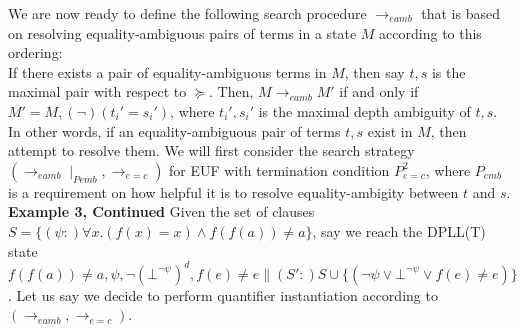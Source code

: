 \documentclass{llncs}
\begin{document}
We are now ready to define the following search procedure $\rightarrow_{eamb}$ that is based on resolving equality-ambiguous pairs of terms in a state $M$ according to this ordering: \\

If there exists a pair of equality-ambiguous terms in $M$, then say $t, s$ is the maximal pair with respect to $\succeq$.
Then, $M \rightarrow_{eamb} M'$ if and only if $M' = M, (\neg)(t_i' = s_i')$, where $t_i', s_i'$ is the maximal depth ambiguity of $t, s$. \\

In other words, if an equality-ambiguous pair of terms $t,s$ exist in $M$, then attempt to resolve them. 
We will first consider the search strategy $( \rightarrow_{eamb} \mid_{Pemb}, \rightarrow_{e=c} )$ for EUF with termination condition $P^2_{e=c}$, where $P_{emb}$ is a requirement on how helpful it is to resolve equality-ambigity between $t$ and $s$. \\

{\bf Example 3, Continued}
Given the set of clauses $S = \{ (\psi :)\forall x. (f( x ) = x) \wedge f( f( a ) ) \neq a \}$, say we reach the DPLL(T) state $f( f( a ) ) \neq a, \psi, \neg (\bot^{\neg \psi})^d, f(e) \neq e \parallel (S':)S \cup \{ ( \neg \psi \vee \bot^{\neg \psi } \vee f( e ) \neq e ) \}$.
Let us say we decide to perform quantifier instantiation according to $( \rightarrow_{eamb}, \rightarrow_{e=c} )$.

\begin{comment}
THIS IS FOR COLLECTED INSTANTIATION
Our maximum pair of equality-ambiguous terms is $f( e ), f( f( a ) )$ and our maximal depth ambiguity is $e = f( a )$.
Searching the branch $e = f( a )$ leads us to a state in which $\psi$ is instantiation-ready with the instantiation $[f(a)/e]$ and $e \neq f( a )$ leads us to a state in which $f( e )$ is equality-independent and our search terminates.
Our search has thus calculated the set $\{ [f(a)/e] \}$.
By applying this instantiation, we obtain the clause $( \neg \psi \vee f( f( a ) ) = f( a ) )$, and after unit propagation we are in the state $f( f( a ) ) \neq a, \psi, \neg (\bot^{\neg \psi})^d, f(e) \neq e, f( f( a ) ) = f( a ) \parallel S'$.
Again, $\psi$ is not instantiation-ready, and we may chose to perform another round of instantiation.

Our maximum pair of equality-ambiguous terms is $f( e ), f( a )$ and our maximal depth ambiguity is $e = a$.
Searching the branch $e = a$ leads us to a state in which $\psi$ is instantiation-ready with the instantiation $[a/e]$.
Otherwise, searching the branch $e \neq a$ leads us to state where we again will split on $e = f( a )$.
In the branch $e = f( a )$, we get the theory conflict $e = f( a ), f( f( a ) ) = f( a ), f( e ) \neq e \models \bot$.
In the branch $e \neq f( a )$, we have that $f( e )$ is equality-independent and our search terminates.
Our search has thus calculated the set $\{ [a/e] \}$, and after adding the instantiation clause $( \neg \psi \vee f( a ) = a )$, the solver answers UNSAT. \\
\end{comment}
\end{document}
